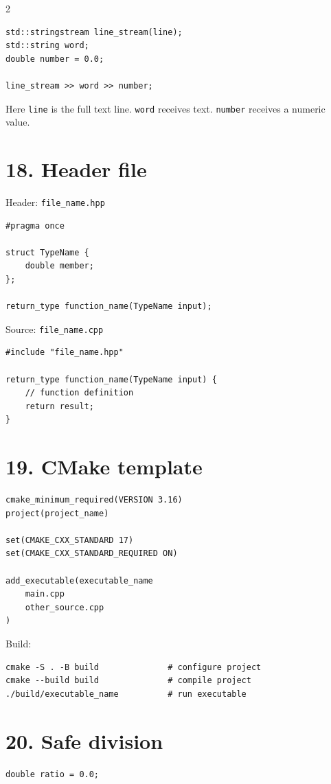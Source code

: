 \documentclass[10pt]{article}
\begin{document}
\begin{multicols}{2}
\begin{lstlisting}[style=cppstyle]
std::stringstream line_stream(line);
std::string word;
double number = 0.0;

line_stream >> word >> number;
\end{lstlisting}

Here \texttt{line} is the full text line. \texttt{word} receives text. \texttt{number} receives a numeric value.

\section{18. Header file}
Header: \texttt{file\_name.hpp}
\begin{lstlisting}[style=cppstyle]
#pragma once

struct TypeName {
    double member;
};

return_type function_name(TypeName input);
\end{lstlisting}

Source: \texttt{file\_name.cpp}
\begin{lstlisting}[style=cppstyle]
#include "file_name.hpp"

return_type function_name(TypeName input) {
    // function definition
    return result;
}
\end{lstlisting}

\section{19. CMake template}
\begin{lstlisting}[style=cppstyle]
cmake_minimum_required(VERSION 3.16)
project(project_name)

set(CMAKE_CXX_STANDARD 17)
set(CMAKE_CXX_STANDARD_REQUIRED ON)

add_executable(executable_name
    main.cpp
    other_source.cpp
)
\end{lstlisting}

Build:
\begin{lstlisting}[style=bashstyle]
cmake -S . -B build              # configure project
cmake --build build              # compile project
./build/executable_name          # run executable
\end{lstlisting}

\section{20. Safe division}
\begin{lstlisting}[style=cppstyle]
double ratio = 0.0;


\end{lstlisting}
\end{multicols}
\end{document}
